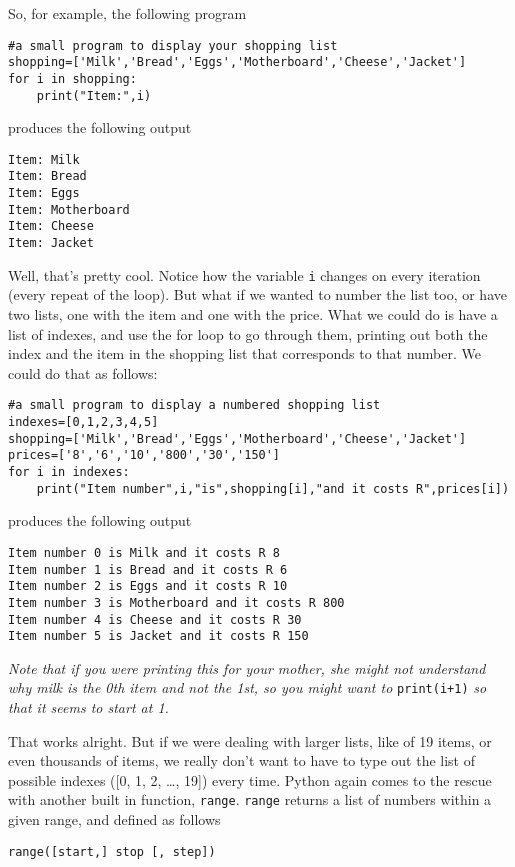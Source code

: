 So, for example, the following program
\begin{lstlisting}
#a small program to display your shopping list
shopping=['Milk','Bread','Eggs','Motherboard','Cheese','Jacket']
for i in shopping:
    print("Item:",i)
\end{lstlisting}

produces the following output
\begin{lstlisting}
Item: Milk
Item: Bread
Item: Eggs
Item: Motherboard
Item: Cheese
Item: Jacket
\end{lstlisting}

Well, that's pretty cool. Notice how the variable \texttt{i} changes on every iteration (every repeat of the loop). But what if we wanted to number the list too, or have two lists, one with the item and one with the price. What we could do is have a list of indexes, and use the for loop to go through them, printing out both the index and the item in the shopping list that corresponds to that number. We could do that as follows: 
\begin{lstlisting}
#a small program to display a numbered shopping list
indexes=[0,1,2,3,4,5]
shopping=['Milk','Bread','Eggs','Motherboard','Cheese','Jacket']
prices=['8','6','10','800','30','150']
for i in indexes:
    print("Item number",i,"is",shopping[i],"and it costs R",prices[i])
\end{lstlisting}   produces the following output  
\lstset{keywordstyle=\ttfamily}
\begin{lstlisting}
Item number 0 is Milk and it costs R 8
Item number 1 is Bread and it costs R 6
Item number 2 is Eggs and it costs R 10
Item number 3 is Motherboard and it costs R 800
Item number 4 is Cheese and it costs R 30
Item number 5 is Jacket and it costs R 150
\end{lstlisting}
\lstset{keywordstyle=\textbf}
\textit{Note that if you were printing this for your mother, she might not understand why milk is the 0th item and not the 1st, so you might want to} \texttt{print(i+1)} \textit{so that it seems to start at 1.}

 That works alright. But if we were dealing with larger lists,   like of 19 items, or even thousands of items, we really don't   want to have to type out the list of possible indexes ([0, 1, 2, \ldots, 19]) every time. Python again comes to the rescue with another built in   function, \texttt{range}.   \texttt{range} returns a list of numbers within a given range, and defined as   follows
\begin{lstlisting}
range([start,] stop [, step])
\end{lstlisting}

